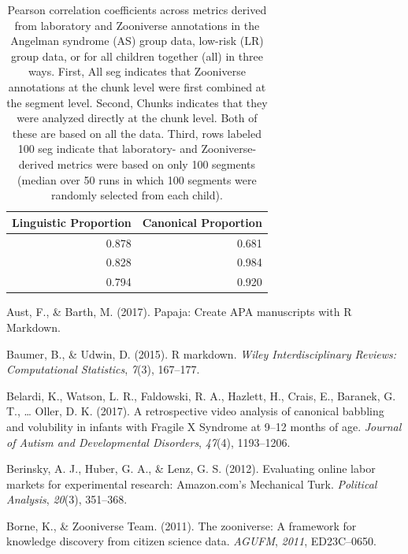 \documentclass[english,,man]{apa6}
\begin{document}
\begin{table}

\caption{\label{tab:tab-cors}Pearson correlation coefficients across metrics derived from laboratory and Zooniverse annotations in the Angelman syndrome (AS) group data, low-risk (LR) group data, or for all children together (all) in three ways. First, All seg indicates that Zooniverse annotations at the chunk level were first combined at the segment level. Second, Chunks indicates that they were analyzed directly at the chunk level. Both of these are based on all the data. Third, rows labeled 100 seg indicate that laboratory- and Zooniverse-derived metrics were based on only 100 segments (median over 50 runs in which 100 segments were randomly selected from each child).}
\centering
\begin{tabular}[t]{r|r}
\hline
Linguistic Proportion & Canonical Proportion\\
\hline
0.878 & 0.681\\
\hline
0.828 & 0.984\\
\hline
0.794 & 0.920\\
\hline
\end{tabular}
\end{table}

\hypertarget{refs}{}
\leavevmode\hypertarget{ref-aust2017papaja}{}%
Aust, F., \& Barth, M. (2017). Papaja: Create APA manuscripts with R Markdown.

\leavevmode\hypertarget{ref-baumer2015r}{}%
Baumer, B., \& Udwin, D. (2015). R markdown. \emph{Wiley Interdisciplinary Reviews: Computational Statistics}, \emph{7}(3), 167--177.

\leavevmode\hypertarget{ref-belardi2017retrospective}{}%
Belardi, K., Watson, L. R., Faldowski, R. A., Hazlett, H., Crais, E., Baranek, G. T., \ldots{} Oller, D. K. (2017). A retrospective video analysis of canonical babbling and volubility in infants with Fragile X Syndrome at 9--12 months of age. \emph{Journal of Autism and Developmental Disorders}, \emph{47}(4), 1193--1206.

\leavevmode\hypertarget{ref-berinsky2012evaluating}{}%
Berinsky, A. J., Huber, G. A., \& Lenz, G. S. (2012). Evaluating online labor markets for experimental research: Amazon.com's Mechanical Turk. \emph{Political Analysis}, \emph{20}(3), 351--368.

\leavevmode\hypertarget{ref-borne2011zooniverse}{}%
Borne, K., \& Zooniverse Team. (2011). The zooniverse: A framework for knowledge discovery from citizen science data. \emph{AGUFM}, \emph{2011}, ED23C--0650.
\end{document}
